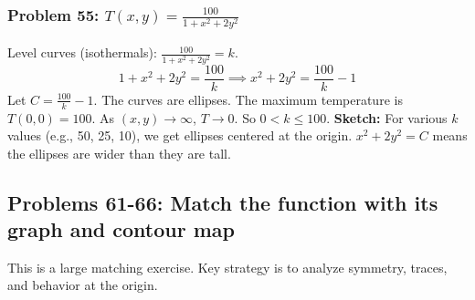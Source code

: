 \documentclass{article}
\begin{document}
\subsubsection{Problem 55: $T(x, y) = \frac{100}{1 + x^2 + 2y^2}$}
Level curves (isothermals): $\frac{100}{1 + x^2 + 2y^2} = k$.
\[ 1 + x^2 + 2y^2 = \frac{100}{k} \implies x^2 + 2y^2 = \frac{100}{k} - 1 \]
Let $C = \frac{100}{k}-1$. The curves are ellipses. The maximum temperature is $T(0,0)=100$. As $(x,y) \to \infty$, $T \to 0$. So $0 < k \le 100$.
\textbf{Sketch:} For various $k$ values (e.g., 50, 25, 10), we get ellipses centered at the origin. $x^2+2y^2=C$ means the ellipses are wider than they are tall.

\subsection{Problems 61-66: Match the function with its graph and contour map}
This is a large matching exercise. Key strategy is to analyze symmetry, traces, and behavior at the origin.
\end{document}
